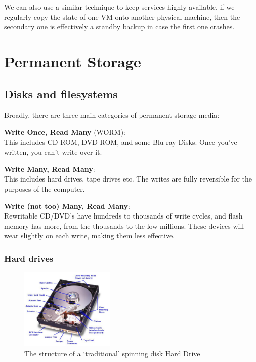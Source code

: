 We can also use a similar technique to keep services highly available, if we
regularly copy the state of one VM onto another physical machine, then the
secondary one is effectively a standby backup in case the first one crashes.

\section{Permanent Storage}

\subsection{Disks and filesystems}

Broadly, there are three main categories of permanent storage media:

\begin{description}
  \item \textbf{Write Once, Read Many} (WORM):\\
    This includes CD-ROM, DVD-ROM, and some Blu-ray Disks. Once you've written,
    you can't write over it.
  \item \textbf{Write Many, Read Many}:\\
    This includes hard drives, tape drives etc. The writes are fully reversible
    for the purposes of the computer. 
  \item \textbf{Write (not too) Many, Read Many}:\\
    Rewritable CD/DVD's have hundreds to thousands of write cycles, and flash
    memory has more, from the thousands to the low millions. These devices will
    wear slightly on each write, making them less effective.
\end{description}

\subsubsection{Hard drives}

\begin{figure}
  \centering
  \includegraphics[width=0.4\textwidth]{images/hard-drive}
  \caption{The structure of a `traditional' spinning disk Hard Drive}
  \label{hard-drive}
\end{figure}

